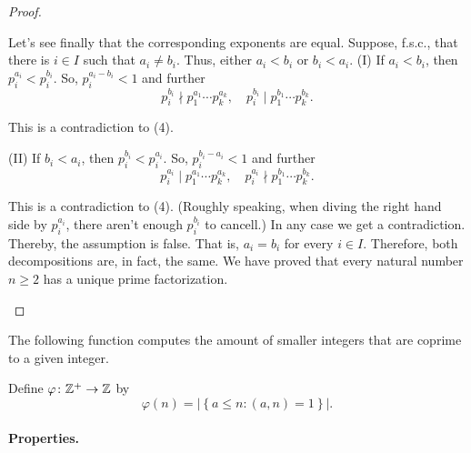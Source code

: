 \documentclass[11pt,a4paper]{article}
\begin{document}
\begin{proof}
\begin{enumerate}[left=2cm]
Let's see finally that the corresponding exponents are equal. Suppose, f.s.c., that there is $i \in I$ such that $a_i \neq b_i$. Thus, either $a_i<b_i$ or $b_i<a_i$.
(I) If $a_i<b_i$, then $p_i^{a_i}<p_i^{b_i}$. So, $p_i^{a_i-b_i}<1$ and further
\[
p_i^{b_i} \nmid p_1^{a_1} \cdots p_k^{a_k}, \quad p_i^{b_i} \mid p_1^{b_1} \cdots p_k^{b_k} .
\]

This is a contradiction to (4).

(II) If $b_i<a_i$, then $p_i^{b_i}<p_i^{a_i}$. So, $p_i^{b_i-a_i}<1$ and further
\[
p_i^{a_i} \mid p_1^{a_1} \cdots p_k^{a_k}, \quad p_i^{a_i} \nmid p_1^{b_1} \cdots p_k^{b_k} .
\]

This is a contradiction to (4). (Roughly speaking, when diving the right hand side by $p_i^{a_i}$, there aren't enough $p_i^{b_i}$ to cancell.)
In any case we get a contradiction. Thereby, the assumption is false. That is, $a_i=b_i$ for every $i \in I$. Therefore, both decompositions are, in fact, the same. We have proved that every natural number $n \geq 2$ has a unique prime factorization.
\end{enumerate}
\end{proof}

The following function  computes the amount of smaller integers that are coprime to a given integer.
\begin{defi}
    Define \(\varphi \colon \mathbb{Z}^+\to \mathbb{Z}\) by 
    \[\varphi(n) = |\left\{ a\leq n : (a,n) = 1 \right\}|.\]
\end{defi}

\paragraph{Properties.} 
\end{document}
